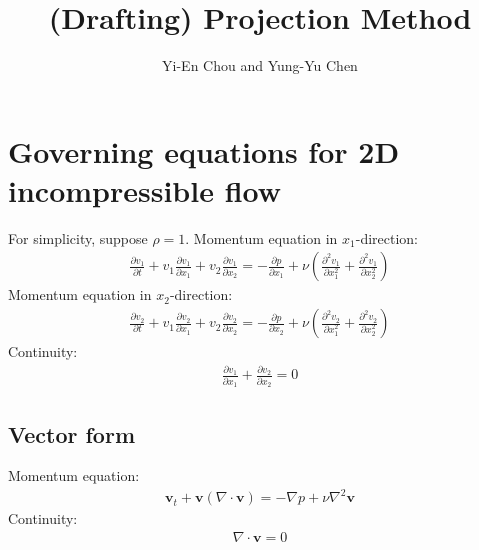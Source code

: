 \documentclass[11pt,dvips]{article}
\title{
%
(Drafting) Projection Method
%
}
\author{
%
Yi-En Chou and Yung-Yu Chen
%
}
\numberwithin{equation}{section}
\begin{document}
\maketitle

\begin{abstract}
%
%
\end{abstract}


\section{Governing equations for 2D incompressible flow}
%
\label{s:projection}

For simplicity, suppose $\rho=1$.
Momentum equation in $x_1$-direction:
%
\begin{align}
\frac{\partial v_1}{\partial t}+v_1 \frac{\partial v_1}{\partial x_1}+v_2 \frac{\partial v_1}
{\partial x_2}=-\frac{\partial p}{\partial x_1}+ \nu (\frac{\partial^2 v_1}{\partial x_1^2}
+\frac{\partial^2 v_1}{\partial x_2^2}) \label{e:x_momentum}
\end{align}
%
Momentum equation in $x_2$-direction:
%
\begin{align}
\frac{\partial v_2}{\partial t}+v_1 \frac{\partial v_2}{\partial x_1}+v_2 \frac{\partial v_2}
{\partial x_2}=-\frac{\partial p}{\partial x_2}+ \nu (\frac{\partial^2 v_2}{\partial x_1^2}
+\frac{\partial^2 v_2}{\partial x_2^2}) \label{e:y_momentum}
\end{align}
%
Continuity:  
%
\begin{align}
\frac{\partial v_1}{\partial x_1}+\frac{\partial v_2}{\partial x_2}=0 \label{e:continuity}
\end{align}
%
\subsection{Vector form}
Momentum equation:
%
\begin{align}
\mathbf{v}_t+\mathbf{v}(\nabla \cdot \mathbf{v})=-\nabla p+\nu \nabla^2 \mathbf{v} 
\label{e:momentum_vec}
\end{align}
%
Continuity:
%
\begin{align}
\nabla \cdot \mathbf{v}=0 \label{e:continuity_vec}
\end{align}
%
\end{document}
